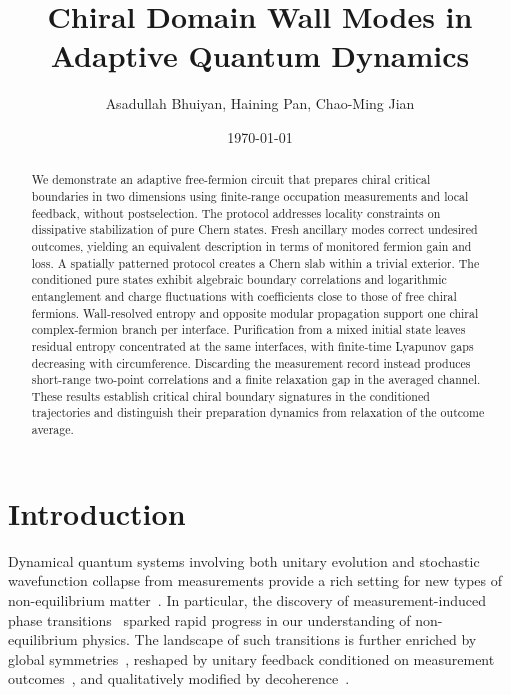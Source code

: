 \documentclass[aps,prb,10pt,twocolumn,superscriptaddress,longbibliography,floatfix]{revtex4-2}
\newcommand{\newtext}[1]{{\color{blue}#1}}
\begin{document}
\raggedbottom

\title{Chiral Domain Wall Modes in Adaptive Quantum Dynamics}
\author{Asadullah Bhuiyan, Haining Pan, Chao-Ming Jian}
\noaffiliation
\date{\today}

\begin{abstract}
\newtext{We demonstrate an adaptive free-fermion circuit that prepares chiral critical boundaries in two dimensions using finite-range occupation measurements and local feedback, without postselection. The protocol addresses locality constraints on dissipative stabilization of pure Chern states. Fresh ancillary modes correct undesired outcomes, yielding an equivalent description in terms of monitored fermion gain and loss. A spatially patterned protocol creates a Chern slab within a trivial exterior. The conditioned pure states exhibit algebraic boundary correlations and logarithmic entanglement and charge fluctuations with coefficients close to those of free chiral fermions. Wall-resolved entropy and opposite modular propagation support one chiral complex-fermion branch per interface. Purification from a mixed initial state leaves residual entropy concentrated at the same interfaces, with finite-time Lyapunov gaps decreasing with circumference. Discarding the measurement record instead produces short-range two-point correlations and a finite relaxation gap in the averaged channel. These results establish critical chiral boundary signatures in the conditioned trajectories and distinguish their preparation dynamics from relaxation of the outcome average.}
\end{abstract}

\maketitle

\setcounter{tocdepth}{2}
\tableofcontents

\section{Introduction}

Dynamical quantum systems involving both unitary evolution and stochastic wavefunction collapse from measurements provide a rich setting for new types of non-equilibrium matter~\cite{PotterVasseur2022,FisherKhemaniNahumVijay2023}.
In particular, the discovery of measurement-induced phase
transitions~\cite{LiChenFisher2018,SkinnerRuhmanNahum2019,ChanNandkishorePretkoSmith2019,LiChenFisher2019,GullansHuse2020}
sparked rapid progress in our understanding of non-equilibrium physics. The landscape of such transitions is further enriched by global symmetries~\cite{SangHsieh2021,BaoChoiAltman2021,LavasaniAlaviradBarkeshli2021,AgrawalEtAl2022,BarrattEtAl2022,MajidyEtAl2023}, reshaped by unitary feedback conditioned on measurement outcomes~\cite{IadecolaEtAl2023,RavindranathEtAl2023,PiroliEtAl2023,SierantTurkeshi2023,ODeaEtAl2024}, and qualitatively modified by
decoherence~\cite{WeinsteinBaoAltman2022,LiSangHsieh2023,LiuLiZhangJian2024,IvakiOjanenMoghaddam2025}.
\end{document}
